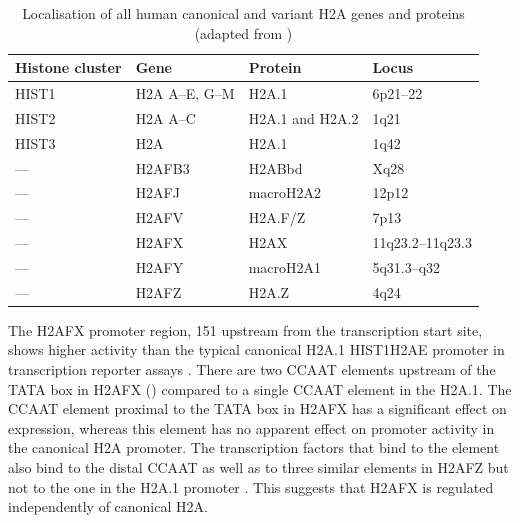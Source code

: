 \begin{table}
\centering
\caption{Localisation of all human canonical and variant H2A genes and proteins (adapted from \protect\citet{WFM+02})}
\label{tab:h2ax-review:H2A-localisation}
\begin{tabular}{l l l l}
\toprule
Histone cluster & Gene & Protein & Locus  \\
\midrule
HIST1 & H2A A--E, G--M  & H2A.1           & 6p21--22\\
HIST2 & H2A A--C        & H2A.1 and H2A.2 & 1q21\\
HIST3 & H2A             & H2A.1           & 1q42\\
---   & H2AFB3          & H2ABbd          & Xq28\\
---   & H2AFJ           & macroH2A2       & 12p12\\
---   & H2AFV           & H2A.F/Z         & 7p13\\
---   & H2AFX           & H2AX            & 11q23.2--11q23.3\\
---   & H2AFY           & macroH2A1       & 5q31.3--q32\\
---   & H2AFZ           & H2A.Z           & 4q24\\
\bottomrule
\end{tabular}
\end{table}

The H2AFX promoter region, \SI{151}{\bp} upstream from the transcription start site, shows higher activity
than the typical canonical H2A.1 HIST1H2AE promoter in transcription reporter assays \citep{VSI94}.
There are two CCAAT elements upstream of the TATA box in H2AFX () compared to a
single CCAAT element in the H2A.1. The CCAAT element proximal to the TATA box in H2AFX has a
significant effect on expression, whereas this element has no apparent effect on promoter activity
in the canonical H2A promoter. The transcription factors that bind to the element also bind to the
distal CCAAT as well as to three similar elements in H2AFZ but not to the one in the H2A.1 promoter \citep{VSI94}.
This suggests that H2AFX is regulated independently of canonical H2A.

